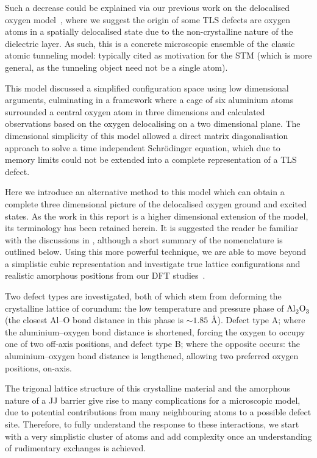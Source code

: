 Such a decrease could be explained via our previous work on the delocalised oxygen model~\cite{DuBois2013,DuBois2015}, where we suggest the origin of some TLS defects are oxygen atoms in a spatially delocalised state due to the non-crystalline nature of the dielectric layer.
As such, this is a concrete microscopic ensemble of the classic atomic tunneling model: typically cited as motivation for the STM (which is more general, as the tunneling object need not be a single atom).

This model discussed a simplified configuration space using low dimensional arguments, culminating in a  framework where a cage of six aluminium atoms surrounded a central oxygen atom in three dimensions and calculated observations based on the oxygen delocalising on a two dimensional plane.
The dimensional simplicity of this model allowed a direct matrix diagonalisation approach to solve a time independent Schrödinger equation, which due to memory limits could not be extended into a complete  representation of a TLS defect.

Here we introduce an alternative method to this model which can obtain a complete three dimensional picture of the delocalised oxygen ground and excited states.
As the work in this report is a higher dimensional extension of the  model, its terminology has been retained herein.
It is suggested the reader be familiar with the discussions in , although a short summary of the nomenclature is outlined below.
Using this more powerful technique, we are able to move beyond a simplistic cubic representation and investigate true lattice configurations and realistic amorphous positions from our DFT studies~\cite{DuBois2013,DuBois2015a}.

Two defect types are investigated, both of which stem from deforming the crystalline lattice of corundum: the low temperature and pressure phase of $\ce{Al_2O_3}$ (the  closest Al--O bond distance in this phase is $\sim\!1.85$ \AA).
Defect type A; where the aluminium--oxygen bond distance is shortened, forcing the oxygen to occupy one of two off-axis positions, and defect type B; where the opposite occurs: the aluminium--oxygen bond distance is lengthened, allowing two preferred oxygen positions, on-axis.

The trigonal lattice structure of this crystalline material and the amorphous nature of a JJ barrier give rise to many complications for a microscopic model, due to potential contributions from many neighbouring atoms to a possible defect site.
Therefore, to fully understand the response to these interactions, we start with a very simplistic cluster of atoms and add complexity once an understanding of rudimentary exchanges is achieved.

